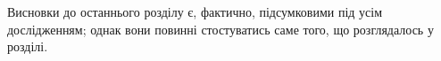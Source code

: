 
\chapconclude{\ref{chap: practice}}

Висновки до останнього розділу є, фактично, підсумковими під усім 
дослідженням; однак вони повинні стостуватись саме того, що розглядалось у 
розділі.